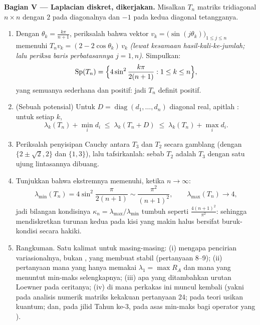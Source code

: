\begin{problem}
\medskip
\noindent\textbf{Bagian V --- Laplacian diskret, dikerjakan.}
Misalkan $T_n$ matriks tridiagonal $n \times n$ dengan $2$ pada
diagonalnya dan $-1$ pada kedua diagonal tetangganya.
\begin{enumerate}[resume]
  \item Dengan $\theta_k = \frac{k\pi}{n+1}$, periksalah bahwa
        vektor $v_k = \bigl(\sin(j\theta_k)\bigr)_{1\leq j\leq
        n}$ memenuhi $T_nv_k = (2 - 2\cos\theta_k)\,v_k$
        \emph{(lewat kesamaan hasil-kali-ke-jumlah; lalu periksa baris
        perbatasannya $j = 1, n$)}. Simpulkan:
        \[
        \operatorname{Sp}(T_n) = \Bigl\{4\sin^2
        \frac{k\pi}{2(n+1)} : 1 \leq k \leq n\Bigr\},
        \]
        yang semuanya sederhana dan positif: jadi $T_n$ definit positif.
  \item (Sebuah potensial) Untuk $D =
        \operatorname{diag}(d_1, \dots, d_n)$ diagonal real, apitlah
        : untuk setiap $k$,
        \[
        \lambda_k(T_n) + \min_i d_i \;\leq\;
        \lambda_k(T_n + D) \;\leq\; \lambda_k(T_n) + \max_i
        d_i .
        \]
  \item Periksalah penyisipan Cauchy antara $T_3$ dan $T_2$
        secara gamblang (dengan  $\{2 \pm \sqrt2, 2\}$ dan $\{1,
        3\}$), lalu tafsirkanlah: sebab $T_2$ adalah $T_3$ dengan satu ujung
        lintasannya dibuang.
  \item Tunjukkan bahwa  ekstremnya memenuhi, ketika $n \to
        \infty$:
        \[
        \lambda_{\min}(T_n) = 4\sin^2\frac{\pi}{2(n+1)}
        \sim \frac{\pi^2}{(n+1)^2},
        \qquad
        \lambda_{\max}(T_n) \to 4 ,
        \]
        jadi bilangan kondisinya $\kappa_n =
        \lambda_{\max}/\lambda_{\min}$ tumbuh seperti
        $\frac{4(n+1)^2}{\pi^2}$: sehingga mendiskretkan turunan
        kedua pada kisi yang makin halus bersifat
        buruk-kondisi secara hakiki.
  \item Rangkuman. Satu kalimat untuk masing-masing: (i) mengapa
        pencirian variasionalnya, bukan , yang membuat  stabil
        (pertanyaan 8--9); (ii) pertanyaan mana yang hanya memakai
        $\lambda_1 = \max R_A$ dan mana yang menuntut min-maks
        selengkapnya; (iii) apa yang ditambahkan urutan Loewner pada
        ceritanya; (iv) di mana perkakas ini muncul kembali (yakni pada
        analisis numerik matriks kekakuan pertanyaan 24; pada teori
        usikan kuantum; dan, pada jilid Tahun ke-3, pada asas
        min-maks bagi operator  yang
        ).

\end{enumerate}
\end{problem}
